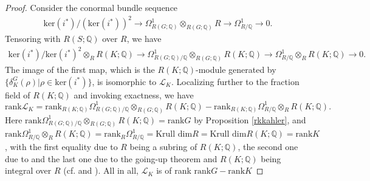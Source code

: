 \documentclass[11pt]{amsart}
\theoremstyle{plain}
\newtheorem{lemma}[theorem]{Lemma}
\theoremstyle{definition}
\begin{document}
\begin{proof}
	Consider the conormal bundle sequence 
		\begin{eqnarray}\label{conormseq}\text{ker}(i^*)/(\text{ker}(i^*))^2\longrightarrow \Omega^1_{R(G; \mathbb{Q})}\otimes_{R(G; \mathbb{Q})}R\longrightarrow \Omega^1_{R/\mathbb{Q}}\longrightarrow 0.\end{eqnarray}
	Tensoring with $R(S; \mathbb{Q})$ over $R$, we have
	\begin{eqnarray*}\text{ker}(i^*)/\text{ker}(i^*)^2\otimes_R R(K; \mathbb{Q})\longrightarrow\Omega^1_{R(G; \mathbb{Q})/\mathbb{Q}}\otimes_{R(G; \mathbb{Q})}R(K; \mathbb{Q})\longrightarrow\Omega^1_{R/\mathbb{Q}}\otimes_R R(K; \mathbb{Q})\longrightarrow 0.\end{eqnarray*}
	The image of the first map, which is the $R(K; \mathbb{Q})$-module generated by $\{\delta_K^G(\rho)|\rho\in\text{ker}(i^*)\}$, is isomorphic to $\mathcal{L}_K$. %
	Localizing further to the fraction field of $R(K; \mathbb{Q})$ and invoking exactness, we have
	\[\text{rank}\mathcal{L}_K=\text{rank}_{R(K; \mathbb{Q})}\Omega^1_{R(G; \mathbb{Q})/\mathbb{Q}}\otimes_{R(G; \mathbb{Q})}R(K; \mathbb{Q})-\text{rank}_{R(K; \mathbb{Q})}\Omega^1_{R/\mathbb{Q}}\otimes_RR(K; \mathbb{Q}).\]
	Here $\text{rank}\Omega^1_{R(G; \mathbb{Q})/\mathbb{Q}}\otimes_{R(G; \mathbb{Q})}R(K; \mathbb{Q})=\text{rank}G$ by Proposition \ref{rkkahler}, and $\text{rank}\Omega^1_{R/\mathbb{Q}}\otimes_RR(K; \mathbb{Q})=\text{rank}_R\Omega^1_{R/\mathbb{Q}}=\text{Krull dim} R=\text{Krull dim} R(K; \mathbb{Q})=\text{rank}K$, with the first equality due to $R$ being a subring of $R(K; \mathbb{Q})$, the second one due to \cite[Lemma 7.13]{CFok} and the last one due to the going-up theorem and $R(K; \mathbb{Q})$ being integral over $R$ (cf. \cite[Remark, p.60]{AM} and \cite[Proposition 3.2]{Se}). All in all, $\mathcal{L}_K$ is of rank $\text{rank}G-\text{rank}K$
\end{proof}
\end{document}
